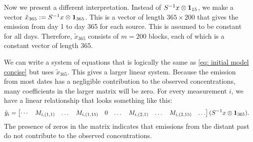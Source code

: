 \documentclass{article}
\begin{document}
Now we present a different interpretation. Instead of $S^{-1} x \otimes \vb{1}_{15}$, we make a vector $\tilde{x}_{365} := S^{-1} x \otimes \vb{1}_{365}$. This is a vector of length $365 \times 200$ that gives the emission from day 1 to day 365 for each source. This is assumed to be constant for all days. Therefore, $\tilde{x}_{365}$ consists of $m = 200$ blocks, each of which is a constant vector of length $365$.

We can write a system of equations that is logically the same as \cref{eq: initial model concise} but uses $\tilde{x}_{365}$. This gives a larger linear system. Because the emission from most dates has a negligible contribution to the observed concentrations, many coefficients in the larger matrix will be zero. For every measurement $i$, we have a linear relationship that looks something like this:
$$
        \hat{y}_i
    =
    \begin{bmatrix}
        \cdots & M_{i,(1,1)} & \dots & M_{i,(1,15)} & 0 & \dots & M_{i,(2,1)} & \dots & M_{i,(2,15)} & \dots
    \end{bmatrix}
    (S^{-1} x \otimes \vb{1}_{365})
.
$$
The presence of zeros in the matrix indicates that emissions from the distant past do not contribute to the observed concentrations.
\end{document}

